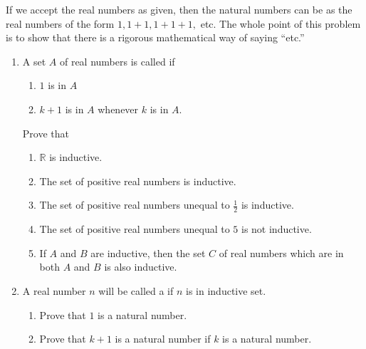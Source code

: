 \begin{pr} \label{2.25} %
  If we accept the real numbers as given, then the natural
  numbers can be  as the real numbers of the
  form $1,1+1,1+1+1,$ etc. The whole point of this problem
  is to show that there is a rigorous mathematical way of
  saying ``etc.''
  \begin{enumerate}[label=(\alph*)]
    \item A set $A$ of real numbers is called 
    if
    \begin{center}
      \begin{minipage}{0.5\textwidth}
        \begin{enumerate}[label=(\arabic*)]
          \item $1$ is in $A$
          \item $k + 1$ is in $A$ whenever $k$ is in $A$.
        \end{enumerate}
      \end{minipage}
    \end{center}
    Prove that
    \begin{enumerate}[label=(\roman*)]
      \item $\mathbb{R}$ is inductive.
      \item The set of positive real numbers is inductive.
      \item The set of positive real numbers unequal to
      $\frac{1}{2}$ is inductive.
      \item The set of positive real numbers unequal to
      $5$ is not inductive.
      \item If $A$ and $B$ are inductive, then the set $C$
      of real numbers which are in both $A$ and $B$ is also
      inductive.
    \end{enumerate}
    \item A real number $n$ will be called a
     if $n$ is in 
    inductive set.
    \begin{enumerate}[label=(\roman*)]
      \item Prove that $1$ is a natural number.
      \item Prove that $k + 1$ is a natural number if
      $k$ is a natural number.
    \end{enumerate}
  \end{enumerate}
\end{pr}

